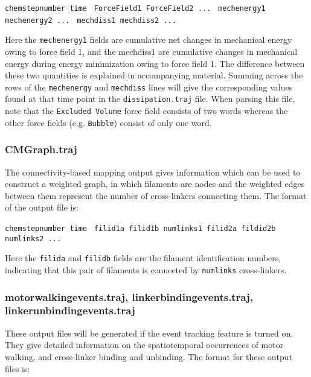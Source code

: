 \documentclass[11pt, oneside]{article}   	%
\begin{document}
\noindent\texttt{chemstepnumber time }\newline
\texttt{ForceField1 ForceField2 ... }\newline
\texttt{mechenergy1 mechenergy2 ... }\newline
\texttt{mechdiss1 mechdiss2 ... }\newline

Here the \texttt{mechenergy1} fields are cumulative net changes in mechanical energy owing to force field 1, and the mechdiss1 are cumulative changes in mechanical energy during energy minimization owing to force field 1.  The difference between these two quantities is explained in accompanying material.  Summing across the rows of the \texttt{mechenergy} and \texttt{mechdiss} lines will give the corresponding values found at that time point in the \texttt{dissipation.traj} file.  When parsing this file, note that the \texttt{Excluded Volume} force field consists of two words whereas the other force fields (e.g. \texttt{Bubble}) consist of only one word.   

\subsubsection{CMGraph.traj}
The connectivity-based mapping output gives information which can be used to construct a weighted graph, in which filaments are nodes and the weighted edges between them represent the number of cross-linkers connecting them.  The format of the output file is:\newline

\noindent\texttt{chemstepnumber time }\newline
\texttt{filid1a filid1b numlinks1 filid2a fildid2b numlinks2 ... }\newline

Here the \texttt{filida} and \texttt{filidb} fields are the filament identification numbers, indicating that this pair of filaments is connected by \texttt{numlinks} cross-linkers.   

\subsubsection{motorwalkingevents.traj, linkerbindingevents.traj, linkerunbindingevents.traj}
These output files will be generated if the event tracking feature is turned on.  They give detailed information on the spatiotemporal occurrences of motor walking, and cross-linker binding and unbinding.  The format for these output files is:\newline
\end{document}
